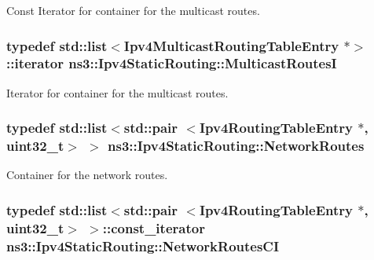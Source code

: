 Const Iterator for container for the multicast routes. 

\subsubsection[{\texorpdfstring{Multicast\+RoutesI}{MulticastRoutesI}}]{\setlength{\rightskip}{0pt plus 5cm}typedef {\bf std\+::list}$<${\bf Ipv4\+Multicast\+Routing\+Table\+Entry} $\ast$$>$\+::iterator {\bf ns3\+::\+Ipv4\+Static\+Routing\+::\+Multicast\+RoutesI}\hspace{0.3cm}{\ttfamily [private]}}\hypertarget{classns3_1_1Ipv4StaticRouting_ac832d5465e0c8f5dd30c6d024c2a2234}{}\label{classns3_1_1Ipv4StaticRouting_ac832d5465e0c8f5dd30c6d024c2a2234}


Iterator for container for the multicast routes. 

\subsubsection[{\texorpdfstring{Network\+Routes}{NetworkRoutes}}]{\setlength{\rightskip}{0pt plus 5cm}typedef {\bf std\+::list}$<$std\+::pair $<${\bf Ipv4\+Routing\+Table\+Entry} $\ast$, uint32\+\_\+t$>$ $>$ {\bf ns3\+::\+Ipv4\+Static\+Routing\+::\+Network\+Routes}\hspace{0.3cm}{\ttfamily [private]}}\hypertarget{classns3_1_1Ipv4StaticRouting_ac3eb49f971bae7619f69b21dffb93078}{}\label{classns3_1_1Ipv4StaticRouting_ac3eb49f971bae7619f69b21dffb93078}


Container for the network routes. 

\subsubsection[{\texorpdfstring{Network\+Routes\+CI}{NetworkRoutesCI}}]{\setlength{\rightskip}{0pt plus 5cm}typedef {\bf std\+::list}$<$std\+::pair $<${\bf Ipv4\+Routing\+Table\+Entry} $\ast$, uint32\+\_\+t$>$ $>$\+::const\+\_\+iterator {\bf ns3\+::\+Ipv4\+Static\+Routing\+::\+Network\+Routes\+CI}\hspace{0.3cm}{\ttfamily [private]}}\hypertarget{classns3_1_1Ipv4StaticRouting_ab8f7a067b65c827dd5012d9a99d79d1e}{}\label{classns3_1_1Ipv4StaticRouting_ab8f7a067b65c827dd5012d9a99d79d1e}


